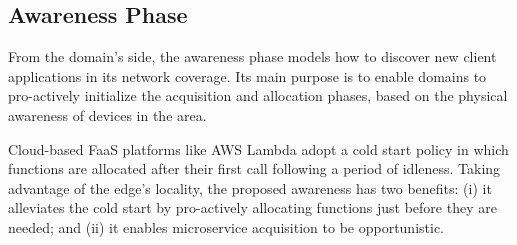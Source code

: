 \subsection*{Awareness Phase}\label{sec:A3-E-awareness}


From the domain's side, the awareness phase models how to discover new client applications in its network coverage. Its main purpose is to enable domains to pro-actively initialize the acquisition and allocation phases, based on the physical awareness of devices in the area. 

Cloud-based FaaS platforms like AWS Lambda adopt a cold start policy in which functions are allocated after their first call following a period of idleness. Taking advantage of the edge's locality, the proposed awareness has two benefits: (i) it alleviates the cold start by pro-actively allocating functions just before they are needed; and (ii) it enables microservice acquisition to be opportunistic.



